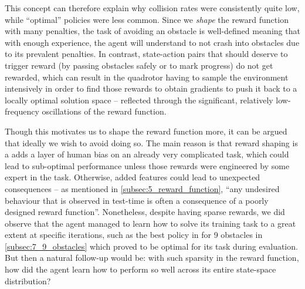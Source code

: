This concept can therefore explain why collision rates were consistently quite low, while ``optimal'' policies were less common. Since we \textit{shape} the reward function with many penalties, the task of avoiding an obstacle is well-defined meaning that with enough experience, the agent will understand to not crash into obstacles due to its prevalent penalties. In contrast, state-action pairs that should deserve to trigger reward (by passing obstacles safely or to mark progress) do not get rewarded, which can result in the quadrotor having to sample the environment intensively in order to find those rewards to obtain gradients to push it back to a locally optimal solution space -- reflected through the significant, relatively low-frequency oscillations of the reward function.

Though this motivates us to shape the reward function more, it can be argued that ideally we wish to avoid doing so. The main reason is that reward shaping is a adds a layer of human bias on an already very complicated task, which could lead to sub-optimal performance unless those rewards were engineered by some expert in the task. Otherwise, added features could lead to unexpected consequences -- as mentioned in \cref{subsec:5_reward_function}, ``any undesired behaviour that is observed in test-time is often a consequence of a poorly designed reward function''.
Nonetheless, despite having sparse rewards, we did observe that the agent managed to learn how to solve its training task to a great extent at specific iterations, such as the best policy in for 9 obstacles in \cref{subsec:7_9_obstacles} which proved to be optimal for its task during evaluation. But then a natural follow-up would be: with such sparsity in the reward function, how did the agent learn how to perform so well across its entire state-space distribution?

